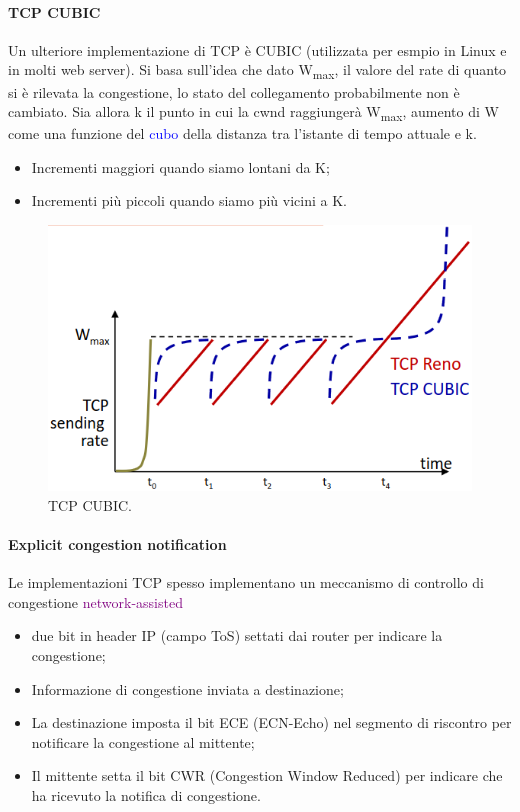 \paragraph{TCP CUBIC}
Un ulteriore implementazione di TCP è CUBIC (utilizzata per esmpio in Linux e in molti web server). 
Si basa sull'idea che dato W\textsubscript{max}, il valore del rate di quanto si è rilevata la congestione, lo stato del collegamento probabilmente non è cambiato. 
Sia allora k il punto in cui la cwnd raggiungerà W\textsubscript{max}, aumento di W come una funzione del \textcolor{blue}{cubo} della distanza tra l’istante di tempo attuale e k.
\begin{itemize}
    \item Incrementi maggiori quando siamo lontani da K;
    \item Incrementi più piccoli quando siamo più vicini a K.
\end{itemize}
\begin{figure}[h]
    \centering
    \includegraphics[scale=0.37]{Immagini/TCPCUBIC.png}
    \caption{TCP CUBIC.}
\end{figure}

\paragraph{Explicit congestion notification}
Le implementazioni TCP spesso implementano un meccanismo di controllo di congestione \textcolor{purple}{network-assisted}
\begin{itemize}
    \item due bit in header IP (campo ToS) settati dai router per indicare la congestione;
    \item Informazione di congestione inviata a destinazione;
    \item La destinazione imposta il bit ECE (ECN-Echo) nel segmento di riscontro per notificare la congestione al mittente;
    \item Il mittente setta il bit CWR (Congestion Window Reduced) per indicare che ha ricevuto la notifica di congestione.
\end{itemize}

